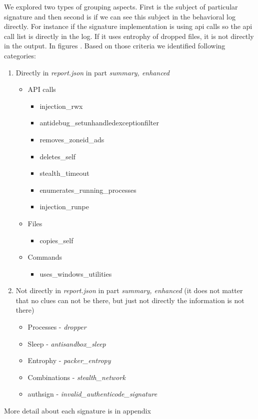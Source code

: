 We explored two types of grouping aspects. First is the subject of particular signature and then second is if we can see this subject in the behavioral log directly. For instance if the signature implementation is using api calls so the api call list is directly in the log. If it uses entrophy of dropped files, it is not directly in the output. In figures . Based on those criteria we identified following categories:
\begin{enumerate}
  \item Directly in \emph{report.json} in part \emph{summary, enhanced}
  \begin{itemize}
    \item API calls
    \begin{itemize}
      \item injection_rwx
      \item antidebug_setunhandledexceptionfilter
      \item removes_zoneid_ads
      \item deletes_self
      \item stealth_timeout
      \item enumerates_running_processes
      \item injection_runpe
    \end{itemize}
    \item Files
    \begin{itemize}
      \item copies_self
    \end{itemize}
    \item Commands
    \begin{itemize}
      \item uses_windows_utilities
    \end{itemize}
  \end{itemize}   
  \item Not directly in \emph{report.json} in part \emph{summary, enhanced} (it does not matter that no clues can not be there, but just not directly the information is not there)
  \begin{itemize}
    \item Processes - \emph{dropper}
    \item Sleep - \emph{ antisandbox_sleep}
    \item Entrophy - \emph{packer_entropy}
    \item Combinations - \emph{stealth_network}
    \item authsign - \emph{invalid_authenticode_signature}
  \end{itemize}
\end{enumerate}
More detail about each signature is in appendix 

